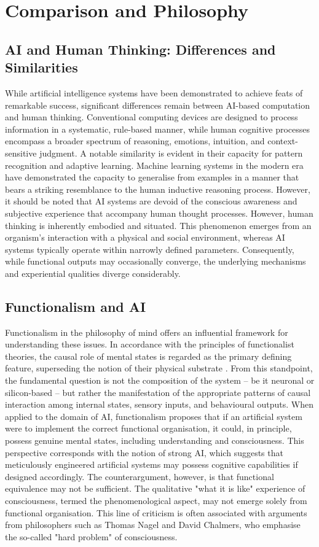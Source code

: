 \documentclass[runningheads]{llncs}
\begin{document}
\section{Comparison and Philosophy}
\subsection{AI and Human Thinking: Differences and Similarities}
%
While artificial intelligence systems have been demonstrated to achieve feats of remarkable success, significant differences remain between AI-based computation and human thinking. Conventional computing devices are designed to process information in a systematic, rule-based manner, while human cognitive processes encompass a broader spectrum of reasoning, emotions, intuition, and context-sensitive judgment.
A notable similarity is evident in their capacity for pattern recognition and adaptive learning. Machine learning systems in the modern era have demonstrated the capacity to generalise from examples in a manner that bears a striking resemblance to the human inductive reasoning process. However, it should be noted that AI systems are devoid of the conscious awareness and subjective experience that accompany human thought processes.
However, human thinking is inherently embodied and situated. This phenomenon emerges from an organism's interaction with a physical and social environment, whereas AI systems typically operate within narrowly defined parameters. Consequently, while functional outputs may occasionally converge, the underlying mechanisms and experiential qualities diverge considerably.
%
%
\subsection{Functionalism and AI}
%
Functionalism in the philosophy of mind offers an influential framework for understanding these issues. In accordance with the principles of functionalist theories, the causal role of mental states is regarded as the primary defining feature, superseding the notion of their physical substrate \cite{putnam1967psychological}. From this standpoint, the fundamental question is not the composition of the system – be it neuronal or silicon-based – but rather the manifestation of the appropriate patterns of causal interaction among internal states, sensory inputs, and behavioural outputs.
When applied to the domain of AI, functionalism proposes that if an artificial system were to implement the correct functional organisation, it could, in principle, possess genuine mental states, including understanding and consciousness. This perspective corresponds with the notion of strong AI, which suggests that meticulously engineered artificial systems may possess cognitive capabilities if designed accordingly.
The counterargument, however, is that functional equivalence may not be sufficient. The qualitative "what it is like" experience of consciousness, termed the phenomenological aspect, may not emerge solely from functional organisation. This line of criticism is often associated with arguments from philosophers such as Thomas Nagel and David Chalmers, who emphasise the so-called "hard problem" of consciousness.
%
%
\end{document}
